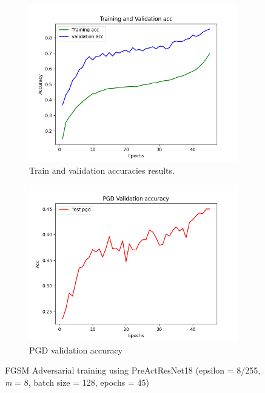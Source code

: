 \documentclass{article}
\begin{document}
\begin{figure}[hbt!]
  \centering
  \begin{subfigure}[b]{0.4\linewidth}
    \includegraphics[width=\linewidth]{images/FastPre/fast2.png}
    \caption{ Train and validation accuracies results.}
  \end{subfigure}
  \begin{subfigure}[b]{0.4\linewidth}
    \includegraphics[width=\linewidth]{images/FastPre/fast5.png}
    \caption{PGD validation accuracy}
  \end{subfigure}
  \caption{FGSM Adversarial training using PreActResNet18 (epsilon = 8/255, \textit{m} = 8, batch size = 128, epochs = 45)}
  \label{fig:coffee}
\end{figure}
\end{document}
